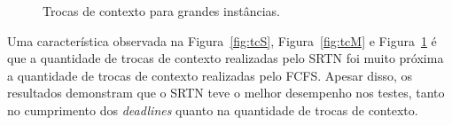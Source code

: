 \documentclass[12pt]{article}
\begin{document}
\begin{figure}
	\centering
	\hfill
	\caption{Trocas de contexto para grandes instâncias.}
	\label{fig:tcL}
\end{figure}

Uma característica observada na Figura~\ref{fig:tcS}, Figura~\ref{fig:tcM} e Figura~\ref{fig:tcL} é que a quantidade de trocas de contexto realizadas pelo SRTN foi muito próxima a quantidade de trocas de contexto realizadas pelo FCFS. Apesar disso, os resultados demonstram que o SRTN teve o melhor desempenho nos testes, tanto no cumprimento dos \textit{deadlines} quanto na quantidade de trocas de contexto.

\clearpage



\end{document}
